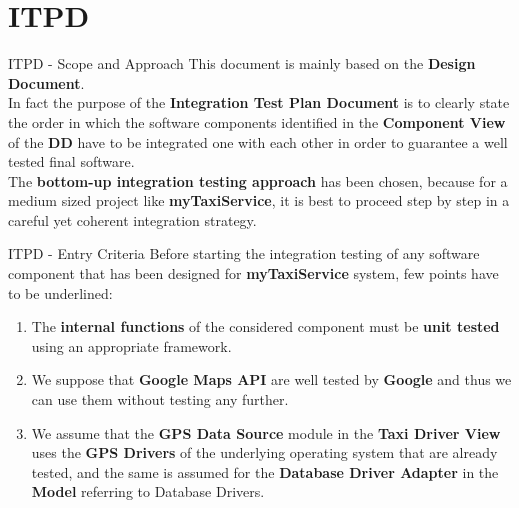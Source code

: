\documentclass{../common/latex_classes/pdf_presentation}
\begin{document}
	\section{ITPD}
	\begin{frame}{ITPD - Scope and Approach}
		This document is mainly based on the \textbf{Design Document}. \\
		\medskip
		In fact the purpose of the \textbf{Integration Test Plan Document} is to clearly state the order in which the software components identified in the \textbf{Component View} of the \textbf{DD} have to be integrated one with each other in order to guarantee a well tested final software.\\
		\medskip
		The \textbf{bottom-up integration testing approach} has been chosen, because for a medium sized project like \textbf{myTaxiService}, it is best to proceed step by step in a careful yet coherent integration strategy.\\
	\end{frame}
	\begin{frame}{ITPD - Entry Criteria}
		Before starting the integration testing of any software component that has been designed for \textbf{myTaxiService} system, few points have to be underlined:
		\begin{enumerate}
			 \item The \textbf{internal functions} of the considered component must be \textbf{unit tested} using an appropriate framework.
			 \item We suppose that \textbf{Google Maps API} are well tested by \textbf{Google} and thus we can use them without testing any
			 further.
			 \item We assume that the \textbf{GPS Data Source} module in the \textbf{Taxi Driver View} uses the \textbf{GPS Drivers} of the underlying operating system that are already tested, and the same is assumed for the \textbf{Database Driver Adapter} in the \textbf{Model} referring to Database Drivers.
		\end{enumerate}
	\end{frame}
\end{document}
